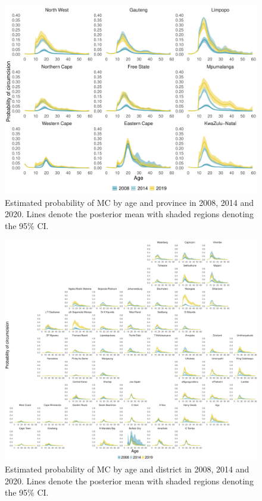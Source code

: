 \documentclass{article}
\begin{document}
\begin{appendix}
\begin{figure}[H]
	\centering
	\includegraphics[width = \linewidth]{Figures/suppmat/Rates/ProbabilityofMC_SingleAge_Province.pdf}
	\caption{Estimated probability of MC by age and province in 2008, 2014 and 2020. Lines denote the posterior mean with shaded regions denoting the 95\% CI.}
\end{figure}	


\begin{figure}[H]
	\centering
	\includegraphics[width = \linewidth]{Figures/suppmat/Rates/ProbabilityofMC_SingleAge_District.pdf}
	\caption{Estimated probability of MC by age and district in 2008, 2014 and 2020. Lines denote the posterior mean with shaded regions denoting the 95\% CI.}
\end{figure}


\end{appendix}
\end{document}
